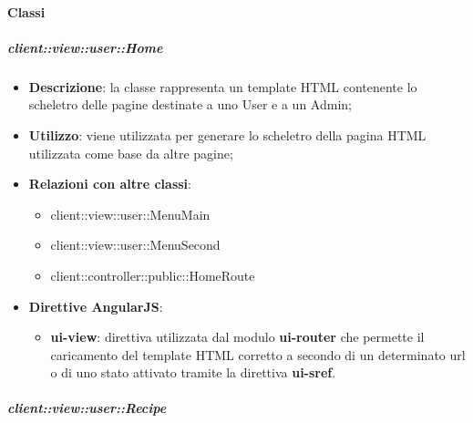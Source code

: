 	\paragraph{Classi} %
		\subparagraph{client::view::user::Home} %
		\label{subp:bdsm_app_client_view_user_home}

			\begin{itemize}
				\item \textbf{Descrizione}: la classe rappresenta un template HTML contenente lo scheletro delle pagine destinate a uno User e a un Admin;
				\item \textbf{Utilizzo}: viene utilizzata per generare lo scheletro della pagina HTML utilizzata come base da altre pagine;
				\item \textbf{Relazioni con altre classi}:
					\begin{itemize}
						\item client::view::user::MenuMain
						\item client::view::user::MenuSecond
						\item client::controller::public::HomeRoute
					\end{itemize}
				\item \textbf{Direttive AngularJS}:
					\begin{itemize}
						\item \textbf{ui-view}: direttiva utilizzata dal modulo \textbf{ui-router} che permette il caricamento del template HTML corretto a secondo di un determinato url o di uno stato attivato tramite la direttiva \textbf{ui-sref}.
					\end{itemize}
			\end{itemize}

		\subparagraph{client::view::user::Recipe} %
		\label{subp:bdsm_app_client_view_user_recipe}

